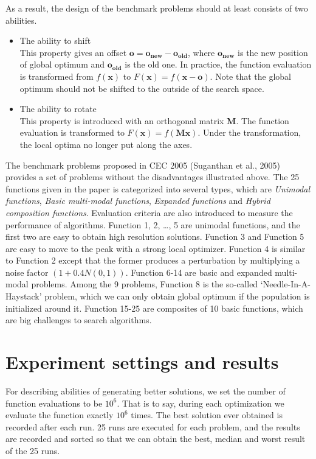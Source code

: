 As a result, the design of the benchmark problems should at least consists of two
abilities.
\begin{itemize}
	\item The ability to shift\\
		This property gives an offset $\mathbf{o} = \mathbf{o_{new}} -
		\mathbf{o_{old}}$, where $\mathbf{o_{new}}$ is the new position of global optimum
		and $\mathbf{o_{old}}$ is the old one. In practice, the function
		evaluation is transformed from $f(\mathbf{x})$ to $F(\mathbf{x}) =
		f(\mathbf{x} - \mathbf{o})$. Note that the global optimum should not be
		shifted to the outside of the search space.
	\item The ability to rotate\\
		This property is introduced with an orthogonal matrix $\mathbf{M}$. The function
		evaluation is transformed to $F(\mathbf{x}) = f(\mathbf{Mx})$. Under the
		transformation, the local optima no longer put along the axes.
\end{itemize}

The benchmark problems proposed in CEC 2005 (Suganthan et al., 2005)
provides a set of problems without the disadvantages illustrated above.
The 25 functions given in the paper is categorized into several types, which are
\emph{Unimodal functions}, \emph{Basic multi-modal functions}, \emph{Expanded functions} and \emph{Hybrid composition functions}. Evaluation criteria are also introduced to measure the performance of algorithms. 
Function 1, 2, \ldots, 5 are unimodal functions, and the first two are easy to obtain high resolution solutions. Function 3 and Function 5 are easy to move to the peak with a strong local optimizer. Function 4 is similar to Function 2 except that the former produces a perturbation by multiplying a noise factor $(1+0.4N(0,1))$. 
Function 6-14 are basic and expanded multi-modal problems. Among the 9
problems, Function 8 is the so-called `Needle-In-A-Haystack' problem, which we can only obtain global optimum if the population is initialized around it. 
Function 15-25 are composites of 10 basic functions, which are big challenges to search algorithms.


\section{Experiment settings and results}
\label{sec:experiment}

For describing abilities of generating better solutions, we set the number of
function evaluations to be $10^6$. 
That is to say, during each optimization we evaluate the function
exactly $10^6$ times. 
The best solution ever obtained is recorded after each run.
25 runs are executed for each problem, and the results are recorded and
sorted so that we can obtain the best, median and worst result of the 25
runs. 

